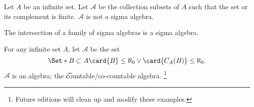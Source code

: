 \begin{expl}
Let $A$ be an infinite set.
Let $\mathcal{A} $ be the collection
subsets of $A$ such that the set or its
complement is finite.
$\mathcal{A} $ is not a sigma algebra.
\end{expl}

\begin{proposition}
The intersection of a family of sigma algebras is a sigma algebra.
\label{sigma_algebra:sigmaintersection}
\end{proposition}

\begin{expl}
For any infinite set $A$, let $\mathcal{A} $ be the set
  \[
\Set*{
B \subset A
}{
\card{B} \leq \aleph_0 \lor
\card{C_{A}(B)} \leq \aleph_0
}.
  \]
$\mathcal{A} $ is an algebra; the \t{countable/co-countable algebra}.
  \ifhmode\unskip\fi\footnote{
Future editions will clean up and modify these examples.
  }
\end{expl}
